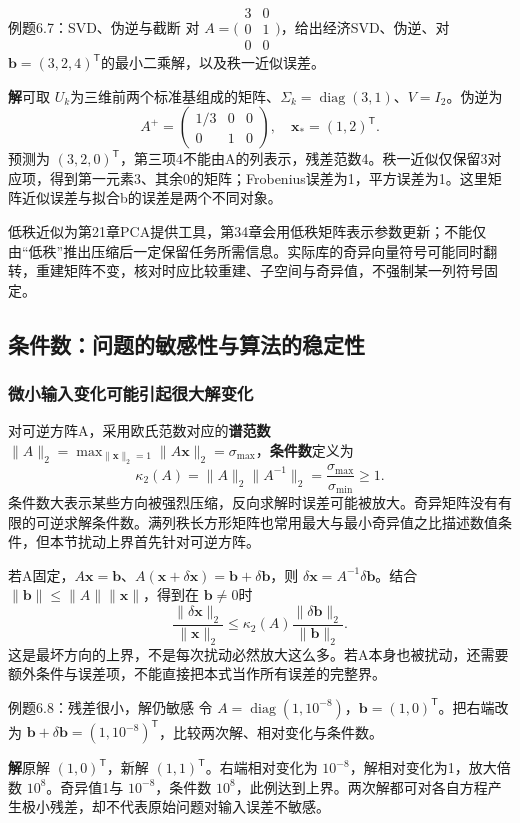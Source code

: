 \documentclass[UTF8,fontset=none,zihao=-4,a4paper]{ctexart}
\newcommand{\term}[1]{\textbf{#1}}
\newcommand{\sol}{\par\noindent\textbf{解}\quad}
\numberwithin{equation}{section}
\numberwithin{figure}{section}
\begin{document}
\begin{infobox}{例题6.7：SVD、伪逆与截断}
对 $A=\bigl(\begin{smallmatrix}3&0\\0&1\\0&0\end{smallmatrix}\bigr)$，给出经济SVD、伪逆、对 $\symbf b=(3,2,4)^{\mathsf T}$的最小二乘解，以及秩一近似误差。
\end{infobox}
\sol 可取 $U_k$为三维前两个标准基组成的矩阵、$\Sigma_k=\operatorname{diag}(3,1)$、$V=I_2$。伪逆为
\[
 A^+=\begin{pmatrix}1/3&0&0\\0&1&0\end{pmatrix},
 \quad\symbf x_*=(1,2)^{\mathsf T}.
\]
预测为 $(3,2,0)^{\mathsf T}$，第三项4不能由A的列表示，残差范数4。秩一近似仅保留3对应项，得到第一元素3、其余0的矩阵；Frobenius误差为1，平方误差为1。这里矩阵近似误差与拟合b的误差是两个不同对象。

低秩近似为第21章PCA提供工具，第34章会用低秩矩阵表示参数更新；不能仅由“低秩”推出压缩后一定保留任务所需信息。实际库的奇异向量符号可能同时翻转，重建矩阵不变，核对时应比较重建、子空间与奇异值，不强制某一列符号固定。

\subsection{条件数：问题的敏感性与算法的稳定性}
\subsubsection{微小输入变化可能引起很大解变化}
对可逆方阵A，采用欧氏范数对应的\term{谱范数} $\|A\|_2=\max_{\|\symbf x\|_2=1}\|A\symbf x\|_2=\sigma_{\max}$，\term{条件数}定义为
\[
 \kappa_2(A)=\|A\|_2\|A^{-1}\|_2=\frac{\sigma_{\max}}{\sigma_{\min}}\ge1.
\]
条件数大表示某些方向被强烈压缩，反向求解时误差可能被放大。奇异矩阵没有有限的可逆求解条件数。满列秩长方形矩阵也常用最大与最小奇异值之比描述数值条件，但本节扰动上界首先针对可逆方阵。

若A固定，$A\symbf x=\symbf b$、$A(\symbf x+\delta\symbf x)=\symbf b+\delta\symbf b$，则 $\delta\symbf x=A^{-1}\delta\symbf b$。结合 $\|\symbf b\|\le\|A\|\|\symbf x\|$，得到在 $\symbf b\ne0$时
\[
 \frac{\|\delta\symbf x\|_2}{\|\symbf x\|_2}
 \le\kappa_2(A)\frac{\|\delta\symbf b\|_2}{\|\symbf b\|_2}.
\]
这是最坏方向的上界，不是每次扰动必然放大这么多。若A本身也被扰动，还需要额外条件与误差项，不能直接把本式当作所有误差的完整界。

\begin{infobox}{例题6.8：残差很小，解仍敏感}
令 $A=\operatorname{diag}(1,10^{-8})$，$\symbf b=(1,0)^{\mathsf T}$。把右端改为 $\symbf b+\delta\symbf b=(1,10^{-8})^{\mathsf T}$，比较两次解、相对变化与条件数。
\end{infobox}
\sol 原解 $(1,0)^{\mathsf T}$，新解 $(1,1)^{\mathsf T}$。右端相对变化为 $10^{-8}$，解相对变化为1，放大倍数 $10^8$。奇异值1与 $10^{-8}$，条件数 $10^8$，此例达到上界。两次解都可对各自方程产生极小残差，却不代表原始问题对输入误差不敏感。
\end{document}
